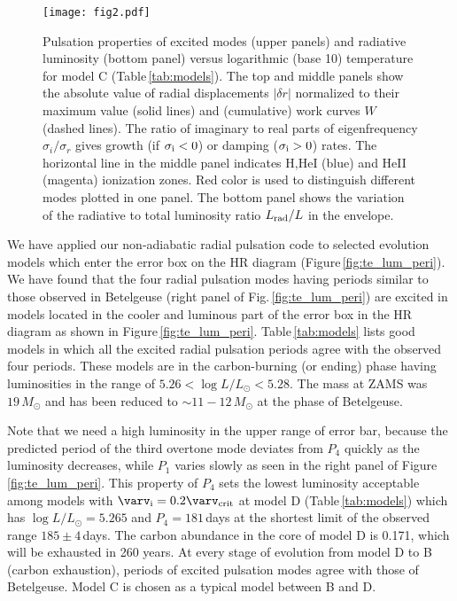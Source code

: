 \documentclass[fleqn,usenatbib]{mnras}
\begin{document}
\begin{figure}
\texttt{[image: fig2.pdf]} %
\caption{Pulsation properties of excited modes (upper panels)
  and radiative luminosity (bottom panel) versus 
 logarithmic (base 10) temperature for model C (Table\,\ref{tab:models}).
The top and middle panels show the absolute value of radial displacements
 $|\delta r|$ normalized to their maximum value (solid lines) 
 and (cumulative) work curves $W$ (dashed lines).
The ratio of imaginary to real parts of eigenfrequency $\sigma_i/\sigma_r$
gives growth (if $\sigma_{\rm i} < 0$) or damping ($\sigma_{\rm i}>0$) rates. 
The horizontal line in the middle panel indicates 
H,HeI (blue) and HeII (magenta) ionization zones.
Red color is used to distinguish different modes plotted in one panel. 
The bottom panel shows the variation of the radiative to total 
luminosity ratio $L_{\rm rad}/L$ in the envelope. 
}
\label{fig:xiwork}
\end{figure}

We have applied our non-adiabatic radial pulsation code to selected evolution
models which enter the error box on the HR diagram (Figure\,\ref{fig:te_lum_peri}).
We have found that the four radial pulsation modes having periods similar to those 
observed in Betelgeuse  (right panel of Fig.\,\ref{fig:te_lum_peri}) are excited in models located in the cooler and luminous 
part of the error box in the HR diagram as shown in Figure\,\ref{fig:te_lum_peri}.
Table\,\ref{tab:models} lists good models in which all 
the excited radial pulsation periods agree with the observed four periods.
These models are in the carbon-burning (or ending) phase having luminosities
in the range of $5.26 < \log L/L_\odot < 5.28$. 
The mass at ZAMS was $19\,M_\odot$ and has been reduced to  
$\sim11 - 12\,M_\odot$ at the phase of Betelgeuse. 

Note that we need a high luminosity in the upper range of error bar, 
because the predicted period of the third overtone mode deviates from $P_4$ quickly 
as the luminosity decreases, while $P_1$ varies slowly  as seen in the right panel of Figure\,\ref{fig:te_lum_peri}. This property of $P_4$ sets the lowest luminosity acceptable among models with $\varv_{\rm i}=0.2\varv_{\rm crit}$ at model D (Table\,\ref{tab:models}) which has $\log L/L_\odot=5.265$ and $P_4=181$\,days at the shortest limit of the observed range $185\pm4$\,days. The carbon abundance in the core of model D is 0.171, which will be exhausted in 260 years. At every stage of evolution from model D to B (carbon exhaustion), periods of excited pulsation modes agree with those of Betelgeuse. Model C is chosen as a typical model between B and D.
\end{document}
